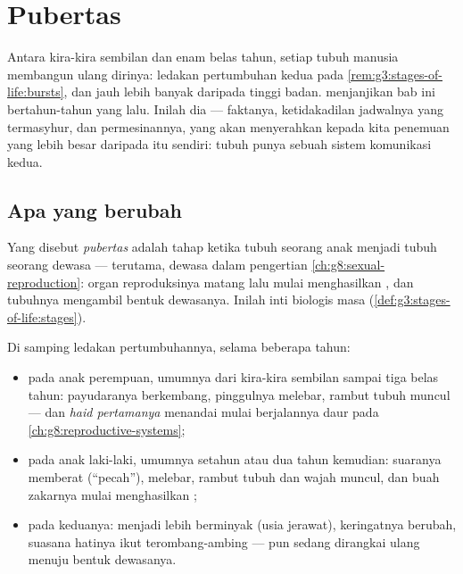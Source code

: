 \chapter{Pubertas}\label{ch:g8:puberty}

Antara kira-kira sembilan dan enam belas tahun, setiap tubuh
manusia membangun ulang dirinya: ledakan pertumbuhan kedua
pada \cref{rem:g3:stages-of-life:bursts}, dan jauh lebih
banyak daripada tinggi badan. 
menjanjikan bab ini bertahun-tahun yang lalu. Inilah dia ---
faktanya, ketidakadilan jadwalnya yang termasyhur, dan
permesinannya, yang akan menyerahkan kepada kita penemuan
yang lebih besar daripada  itu sendiri: tubuh punya
sebuah sistem komunikasi kedua.

\section{Apa yang berubah}

\begin{definition}[Pubertas]\label{def:g8:puberty:puberty}
Yang disebut \emph{pubertas} adalah tahap
ketika tubuh seorang anak menjadi tubuh seorang dewasa ---
terutama, dewasa dalam pengertian
\cref{ch:g8:sexual-reproduction}: organ reproduksinya matang
lalu mulai menghasilkan \emph{}, dan tubuhnya mengambil
bentuk dewasanya. Inilah inti biologis masa 
(\cref{def:g3:stages-of-life:stages}).
\end{definition}

\begin{proposition}\label{prop:g8:puberty:changes}
Di samping ledakan pertumbuhannya, selama beberapa tahun:
\begin{itemize}
  \item pada anak perempuan, umumnya dari kira-kira sembilan
        sampai tiga belas tahun: payudaranya berkembang,
        pinggulnya melebar, rambut tubuh muncul --- dan
        \emph{haid pertamanya} menandai mulai berjalannya
        daur pada \cref{ch:g8:reproductive-systems};
  \item pada anak laki-laki, umumnya setahun atau dua tahun
        kemudian: suaranya memberat (``pecah''), 
        melebar, rambut tubuh dan wajah muncul, dan buah
        zakarnya mulai menghasilkan ;
  \item pada keduanya:  menjadi lebih berminyak
        (usia jerawat), keringatnya berubah, suasana hatinya
        ikut terombang-ambing ---  pun sedang
        dirangkai ulang menuju bentuk dewasanya.
\end{itemize}
\end{proposition}
\admitted

